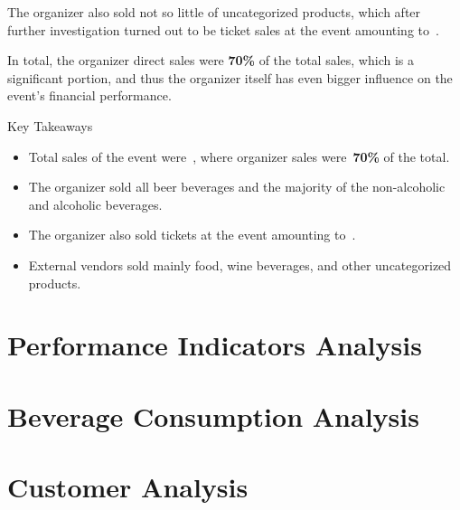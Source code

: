 The organizer also sold not so little of uncategorized products, which after further investigation turned out to be ticket sales at the event amounting to~.

In total, the organizer direct sales were \textbf{70\%} of the total sales, which is a significant portion, and thus the organizer itself has even bigger influence on the event's financial performance.

\begin{blue-box}{Key Takeaways}
	\begin{itemize}
		\item Total sales of the event were~, where organizer sales were~\textbf{70\%} of the total.
		\item The organizer sold all beer beverages and the majority of the non-alcoholic and alcoholic beverages.
		\item The organizer also sold tickets at the event amounting to~.
		\item External vendors sold mainly food, wine beverages, and other uncategorized products.
	\end{itemize}
\end{blue-box}


\section{Performance Indicators Analysis}
\label{sec:analysis-performance-indicators}


\section{Beverage Consumption Analysis}
\label{sec:analysis-beverage-consumption}


\section{Customer Analysis}
\label{sec:analysis-customers}

